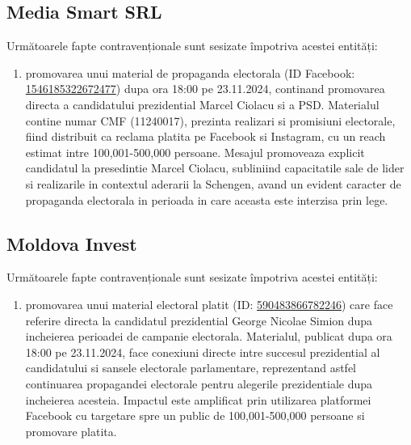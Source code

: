 \documentclass[a4paper,12pt]{article}
\begin{document}
\vspace{0.5cm}

\subsection{Media Smart SRL}
Următoarele fapte contravenționale sunt sesizate împotriva acestei entități:

\begin{enumerate}[leftmargin=*, label=\arabic*.)]
    \item promovarea unui material de propaganda electorala (ID Facebook: \href{https://www.facebook.com/ads/library/?id=1546185322672477}{1546185322672477}) dupa ora 18:00 pe 23.11.2024, continand promovarea directa a candidatului prezidential Marcel Ciolacu si a PSD. Materialul contine numar CMF (11240017), prezinta realizari si promisiuni electorale, fiind distribuit ca reclama platita pe Facebook si Instagram, cu un reach estimat intre 100,001-500,000 persoane. Mesajul promoveaza explicit candidatul la presedintie Marcel Ciolacu, subliniind capacitatile sale de lider si realizarile in contextul aderarii la Schengen, avand un evident caracter de propaganda electorala in perioada in care aceasta este interzisa prin lege.
\end{enumerate}

\vspace{0.5cm}

\subsection{Moldova Invest}
Următoarele fapte contravenționale sunt sesizate împotriva acestei entități:

\begin{enumerate}[leftmargin=*, label=\arabic*.)]
    \item promovarea unui material electoral platit (ID: \href{https://www.facebook.com/ads/library/?id=590483866782246}{590483866782246}) care face referire directa la candidatul prezidential George Nicolae Simion dupa incheierea perioadei de campanie electorala. Materialul, publicat dupa ora 18:00 pe 23.11.2024, face conexiuni directe intre succesul prezidential al candidatului si sansele electorale parlamentare, reprezentand astfel continuarea propagandei electorale pentru alegerile prezidentiale dupa incheierea acesteia. Impactul este amplificat prin utilizarea platformei Facebook cu targetare spre un public de 100,001-500,000 persoane si promovare platita.
\end{enumerate}
\end{document}
